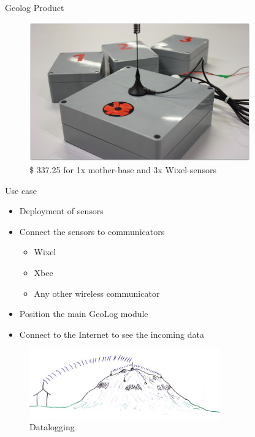 \documentclass{beamer}
\begin{document}
\begin{frame}{Geolog Product}
	\begin{figure}
		\centering
		\includegraphics[height=6cm]{graphics/Field_pictures/Our_product.JPG}
		\caption{\$ 337.25 for 1x mother-base and 3x Wixel-sensors}
	\end{figure}
\end{frame}

\begin{frame}{Use case}
	\begin{itemize}
	\item Deployment of sensors
	\item Connect the sensors to communicators
		\begin{itemize}
		\item Wixel
		\item Xbee
		\item Any other wireless communicator
		\end{itemize}
	\item Position the main GeoLog module
	\item Connect to the Internet to see the incoming data
	\end{itemize}
	\begin{figure}
			\centering
	        \includegraphics[height=3cm]{graphics/GeoLog.PNG}
	        \caption{Datalogging}
	\end{figure}

\end{frame}
\end{document}
